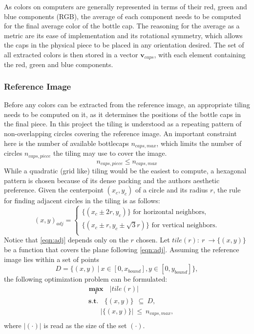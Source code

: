 \documentclass{article}
\begin{document}
As colors on computers are generally represented in terms of their red, green and blue components (RGB), the average of each component needs to be computed for the final average color of the bottle cap.
The reasoning for the average as a metric are its ease of implementation and its rotational symmetry, which allows the caps in the physical piece to be placed in any orientation desired. 
The set of all extracted colors is then stored in a vector $\boldsymbol{v}_{caps}$, with each element containing the red, green and blue components.

\subsubsection{Reference Image}
Before any colors can be extracted from the reference image, an appropriate tiling needs to be computed on it, as it determines the positions of the bottle caps in the final piece. In this project the tiling is understood as a repeating pattern of non-overlapping circles covering the reference image. 
An important constraint here is the number of available bottlecaps $n_{caps,max}$, which limits the number of circles $n_{caps,piece}$ the tiling may use to cover the image.  
\begin{equation}
\label{eqn:max}
n_{caps,piece} \leq n_{caps,max} 
\end{equation}
While a quadratic (grid like) tiling would be the easiest to compute, a hexagonal pattern is chosen because of its dense packing and the authors aesthetic preference. Given the centerpoint $(x_c,y_c)$ of a circle and its radius $r$, the rule for finding adjacent circles in the tiling is as follows:
\begin{equation}
\label{eqn:adj}
(x,y)_{adj} = 
	\begin{cases}
		\{(x_c \pm 2r,y_c)\} \text{ for horizontal neighbors,} \\
		\{(x_c \pm r, y_c \pm \sqrt{3}r)\} \text{ for vertical neighbors.} \\
	\end{cases}
\end{equation}
Notice that \ref{eqn:adj} depends only on the $r$ chosen. 
Let $tile(r):\ r\ \rightarrow \{(x,y)\}$ be a function that covers the plane following \ref{eqn:adj}.
Assuming the reference image lies within a set of points 
\begin{equation}
	D = \{(x,y)\ \vert\ x \in [0,x_{bound}], y \in [0,y_{bound}]\},
\end{equation}
the following optimization problem can be formulated:
\begin{equation}
\label{eqn:tile}
\begin{aligned}
& \ \boldsymbol{\max_{r}}\ \ \ \lvert tile(r) \rvert \\
& \ \ \textbf{s.t.}\ \ \ \ \{(x,y)\}\ \ \subseteq\ D,  \\
& \ \ \ \ \ \ \ \ \ \ \vert \{(x,y)\} \vert\ \leq\ n_{caps,max}, \\
\end{aligned}
\end{equation}
where $|(\cdot)|$ is read as the size of the set $(\cdot)$.
\end{document}
